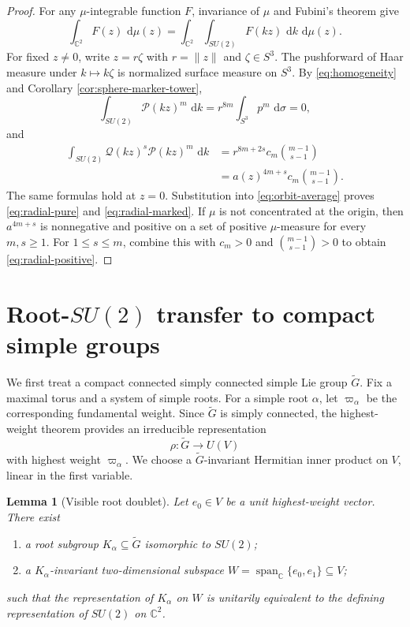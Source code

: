 \documentclass[11pt]{article}
\numberwithin{equation}{section}
\newtheorem{lemma}[theorem]{Lemma}
\newcommand{\C}{\mathbb C}
\newcommand{\Span}{\operatorname{span}}
\newcommand{\dd}{\,\mathrm d}
\begin{document}
\begin{proof}
For any $\mu$-integrable function $F$, invariance of $\mu$ and Fubini's
theorem give
\begin{equation}\label{eq:orbit-average}
 \int_{\C^2}F(z)\,\dd\mu(z)
 =\int_{\C^2}\int_{SU(2)}F(kz)\,\dd k\,\dd\mu(z).
\end{equation}
For fixed $z\neq0$, write $z=r\zeta$ with $r=\|z\|$ and $\zeta\in S^3$.
The pushforward of Haar measure under $k\mapsto k\zeta$ is normalized surface
measure on $S^3$.  By \eqref{eq:homogeneity} and
Corollary \ref{cor:sphere-marker-tower},
\[
 \int_{SU(2)}\mathscr P(kz)^m\,\dd k
 =r^{8m}\int_{S^3}p^m\,\dd\sigma=0,
\]
and
\begin{align*}
 \int_{SU(2)}\mathscr Q(kz)^s\mathscr P(kz)^m\,\dd k
 &=r^{8m+2s}c_m\binom{m-1}{s-1}\\
 &=a(z)^{4m+s}c_m\binom{m-1}{s-1}.
\end{align*}
The same formulas hold at $z=0$.  Substitution into
\eqref{eq:orbit-average} proves \eqref{eq:radial-pure} and
\eqref{eq:radial-marked}.  If $\mu$ is not concentrated at the origin, then
$a^{4m+s}$ is nonnegative and positive on a set of positive $\mu$-measure for
every $m,s\geq1$.  For $1\leq s\leq m$, combine this with $c_m>0$ and
$\binom{m-1}{s-1}>0$ to obtain \eqref{eq:radial-positive}.
\end{proof}

\section{Root-\texorpdfstring{$SU(2)$}{SU(2)} transfer to compact simple groups}

We first treat a compact connected simply connected simple Lie group
$\widetilde G$.  Fix a maximal torus and a system of simple roots.  For a
simple root $\alpha$, let $\varpi_\alpha$ be the corresponding fundamental
weight.  Since $\widetilde G$ is simply connected, the highest-weight theorem
provides an irreducible representation
\begin{equation}\label{eq:fundamental-representation}
 \rho:\widetilde G\longrightarrow U(V)
\end{equation}
with highest weight $\varpi_\alpha$.  We choose a $\widetilde G$-invariant
Hermitian inner product on $V$, linear in the first variable.

\begin{lemma}[Visible root doublet]\label{lem:root-doublet}
Let $e_0\in V$ be a unit highest-weight vector.  There exist
\begin{enumerate}[label=\textup{(\roman*)}]
\item a root subgroup $K_\alpha\subseteq\widetilde G$ isomorphic to $SU(2)$;
\item a $K_\alpha$-invariant two-dimensional subspace
$W=\Span_\C\{e_0,e_1\}\subseteq V$;
\end{enumerate}
such that the representation of $K_\alpha$ on $W$ is unitarily equivalent to
the defining representation of $SU(2)$ on $\C^2$.
\end{lemma}
\end{document}
